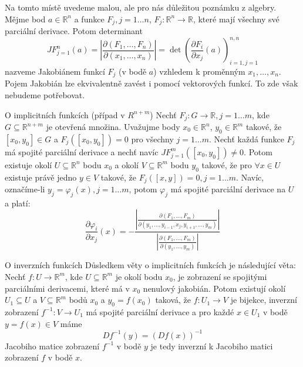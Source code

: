 \begin{poznamka}
Na tomto místě uvedeme malou, ale pro nás důležitou poznámku z algebry. Mějme bod $a \in \mathbb{R}^n$ a funkce $F_j, j=1 \ldots n$, $F_j: \mathbb{R}^n \rightarrow \mathbb{R}$, které mají všechny své parciální derivace. Potom determinant
\begin{equation}
JF_{j=1}^n(a)= \left|\frac{\partial (F_1, \ldots, F_n)}{\partial (x_1,\ldots,x_n)}\right| = \det
\left(
\frac{\partial F_i}{\partial x_j}(a)
\right)
_{i = 1, j = 1}^{n,n}
\end{equation}
nazveme Jakobiánem funkcí $F_j$ (v bodě $a$) vzhledem k proměnným $x_1, \ldots, x_n$. Pojem Jakobián lze ekvivalentně zavést i pomocí vektorových funkcí. To zde však nebudeme potřebovat.
\end{poznamka}

\begin{vetaN}{O implicitních funkcích (případ v $R^{n + m}$)}
Nechť $F_j: G \rightarrow \mathbb{R}, j=1 \ldots m$, kde $G \subseteq \mathbb{R}^{n+m}$ je otevřená množina. Uvažujme body $x_0 \in \mathbb{R}^n$, $y_0 \in \mathbb{R}^m$ takové, že $[x_0, y_0] \in G$ a $F_j([x_0, y_0]) = 0$ pro všechny $j=1 \ldots m$. Nechť každá funkce $F_j$ má spojité parciální derivace a nechť navíc $JF_{j=1}^m([x_0, y_0]) \neq 0$. Potom existuje okolí $U \subseteq \mathbb{R}^n$ bodu $x_0$ a okolí $V \subseteq \mathbb{R}^m$ bodu $y_0$ takové, že pro $\forall x \in U$ existuje právě jedno $y \in V$ takové, že $F_j([x,y]) = 0, j=1 \ldots m$. Navíc, označíme-li $y_j = \varphi_j(x), j=1 \ldots m$, potom $\varphi_j$ má spojité parciální derivace na $U$ a platí:
$$\frac{\partial \varphi_i}{\partial x_j}(x) = -\frac{\left|\frac{\partial (F_1, \ldots, F_m)}{\partial (y_1,\ldots,y_{i-1},x_j,y_{i+1},\ldots,y_m)}\right|}{\left|\frac{\partial (F_1, \ldots, F_m)}{\partial (y_1,\ldots,y_m)}\right|}$$
\end{vetaN}

\begin{vetaN}{O inverzních funkcích}
Důsledkem věty o implicitních funkcích je následující věta:  Nechť $f : U \to \mathbb{R}^m$, kde $U \subseteq \mathbb{R}^m$ je okolí bodu $x_0$, je zobrazení se spojitými parciálními derivacemi, které má v $x_0$ nenulový jakobián. Potom existují okolí $U_1 \subseteq U$ a $V \subseteq \mathbb{R}^m$ bodů $x_0$ a $y_0 = f(x_0)$ taková, že $f : U_1 \to V$ je bijekce, inverzní zobrazení $f^{-1} : V \to U_1$ má spojité parciální derivace a pro každé $x \in U_1$ v bodě $y = f(x) \in V$ máme
$$Df^{-1}(y) = (Df(x))^{-1}$$
Jacobiho matice zobrazení $f^{-1}$ v bodě $y$ je tedy inverzní k Jacobiho matici zobrazení $f$ v bodě $x$.
\end{vetaN}

